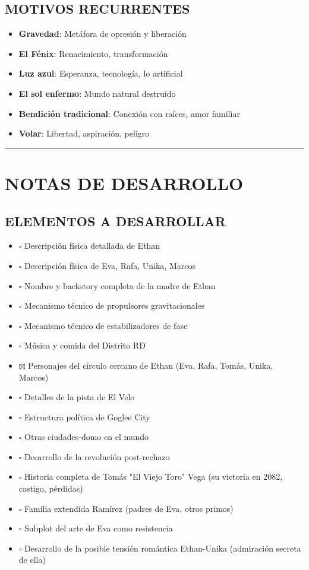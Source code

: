 \documentclass[11pt,a4paper]{report}
\begin{document}
\subsection{MOTIVOS RECURRENTES}

\begin{itemize}
  \item \textbf{Gravedad}: Metáfora de opresión y liberación
  \item \textbf{El Fénix}: Renacimiento, transformación
  \item \textbf{Luz azul}: Esperanza, tecnología, lo artificial
  \item \textbf{El sol enfermo}: Mundo natural destruido
  \item \textbf{Bendición tradicional}: Conexión con raíces, amor familiar
  \item \textbf{Volar}: Libertad, aspiración, peligro

\end{itemize}
\bigskip\hrule\bigskip

\section{NOTAS DE DESARROLLO}

\subsection{ELEMENTOS A DESARROLLAR}

\begin{itemize}
  \item $\square$ Descripción física detallada de Ethan
  \item $\square$ Descripción física de Eva, Rafa, Unika, Marcos
  \item $\square$ Nombre y backstory completa de la madre de Ethan
  \item $\square$ Mecanismo técnico de propulsores gravitacionales
  \item $\square$ Mecanismo técnico de estabilizadores de fase
  \item $\square$ Música y comida del Distrito RD
  \item $\boxtimes$ Personajes del círculo cercano de Ethan (Eva, Rafa, Tomás, Unika, Marcos)
  \item $\square$ Detalles de la pista de El Velo
  \item $\square$ Estructura política de Goglee City
  \item $\square$ Otras ciudades-domo en el mundo
  \item $\square$ Desarrollo de la revolución post-rechazo
  \item $\square$ Historia completa de Tomás "El Viejo Toro" Vega (su victoria en 2082, castigo, pérdidas)
  \item $\square$ Familia extendida Ramírez (padres de Eva, otros primos)
  \item $\square$ Subplot del arte de Eva como resistencia
  \item $\square$ Desarrollo de la posible tensión romántica Ethan-Unika (admiración secreta de ella)

\end{itemize}
\end{document}

